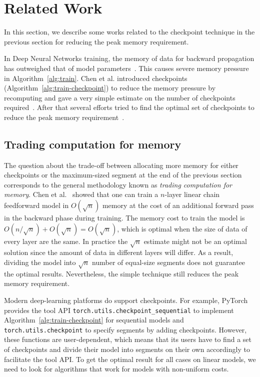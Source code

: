 \section{Related Work}
\label{sec:related}

In this section, we describe some works related to the checkpoint technique in the previous section for reducing the peak memory requirement.

In Deep Neural Networks training, the memory of data for backward propagation has outweighed that of model parameters~\cite{sohoni2022lowmemory}. 
This causes severe memory pressure in Algorithm~\ref{alg:train}. 
Chen et al. introduced checkpoints (Algorithm~\ref{alg:train-checkpoint}) to reduce the memory pressure by recomputing and gave a very simple estimate on the number of checkpoints required~\cite{chen2016training}.
After that several efforts tried to find the optimal set of checkpoints to reduce the peak memory requirement~\cite{feng2021optimal}. 

\subsection{Trading computation for memory}

The question about the trade-off between allocating more memory for either checkpoints or the maximum-sized segment at the end of the previous section corresponds to the general methodology known as {\em trading computation for memory}.
Chen et al.~\cite{chen2016training} showed that one can train a $n$-layer linear chain feedforward model in $O(\sqrt{n})$ memory at the cost of an additional forward pass in the backward phase during training.
The memory cost to train the model is $O(n/\sqrt{n})+O(\sqrt{n}) = O(\sqrt{n})$, which is optimal when the size of data of every layer are the same.
In practice the $\sqrt{n}$ estimate might not be an optimal solution since the amount of data in different layers will differ.
As a result, dividing the model into $\sqrt{n}$ number of equal-size segments does not guarantee the optimal results.
Nevertheless, the simple technique still reduces the peak memory requirement.

Modern deep-learning platforms do support checkpoints.
For example, PyTorch~\cite{paszke2019pytorch} provides the tool API \texttt{torch.utils.checkpoint\_sequential} to implement Algorithm~\ref{alg:train-checkpoint} for sequential models and \texttt{torch.utils.checkpoint} to specify segments by adding checkpoints.
However, these functions are user-dependent, which means that its users have to find a set of checkpoints and divide their model into segments on their own accordingly to facilitate the tool API. To get the optimal result for all cases on linear models, we need to look for algorithms that work for models with non-uniform costs.

